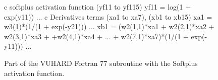 \documentclass[algorithms,article,submit,pdftex,oneauthors]{Definitions/mdpi}
\DeclareRobustCommand{\w}{\mbox{\large\ensuremath{\mathsf{w}}}}
\begin{document}
\begin{figure}[h!]
\begin{FortranListing}
c softplus activation function (yf11 to yf115)
      yf11 = log(1 + exp(y11))
      ...
c Derivatives terms (xa1 to xa7), (xb1 to xb15)
      xa1 = w3(1)*(1/(1 + exp(-y21)))
      ...
      xb1 = (w2(1,1)*xa1 + w2(2,1)*xa2 + w2(3,1)*xa3
     + +w2(4,1)*xa4 + ... + w2(7,1)*xa7)*(1/(1 + exp(-y11)))
      ...
\end{FortranListing}
\caption{Part of the VUHARD Fortran 77 subroutine with the Softplus activation function.\label{fig:FortranSoftplus}}
\end{figure}

%
\end{document}
